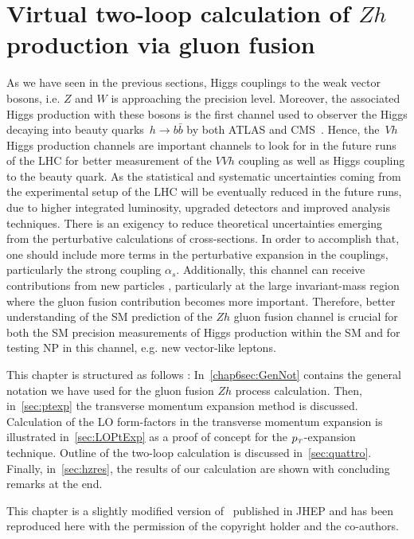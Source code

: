 \chapter{ Virtual two-loop calculation of  $Zh$ production via gluon fusion}\label{chap:hz}
\par As we have seen in the previous sections, Higgs couplings to the weak vector bosons, i.e. $Z$ and $W$ is approaching the precision level. Moreover, the associated Higgs production with these bosons is the first channel used to observer the Higgs decaying into beauty quarks~$h \rightarrow b \bar{b}$ by both ATLAS and CMS~\cite{Aaboud:2018zhk, Sirunyan:2018kst}. Hence, the~$Vh$ Higgs production channels are important channels to look for in the future runs of the LHC for better measurement of the $VVh$ coupling as well as Higgs coupling to the beauty quark. As the statistical and systematic uncertainties coming from the experimental setup of the LHC will be eventually reduced in the future runs, due to higher integrated luminosity,  upgraded detectors and improved analysis techniques. There is an exigency to reduce theoretical uncertainties emerging from the perturbative calculations of  cross-sections. In order to accomplish that, one should include more terms in the perturbative expansion in the couplings, particularly the strong coupling $\alpha_s$. 
Additionally, this channel can receive contributions from new particles \cite{Harlander:2013mla}, particularly at the large invariant-mass region where the gluon fusion contribution becomes more important. Therefore, better understanding of the SM prediction of the $Zh$ gluon fusion channel is crucial for both the SM precision measurements of Higgs production within the SM and for testing NP in this channel, e.g. new vector-like leptons.  
\par This chapter is structured as follows : In~\autoref{chap6sec:GenNot} contains the general notation we have used for the gluon fusion $Zh$ process calculation. Then, in~\autoref{sec:ptexp} the transverse momentum expansion method is discussed.  Calculation of the LO form-factors in the transverse momentum expansion is illustrated in~\autoref{sec:LOPtExp} as a proof of concept for the $p_{\scriptscriptstyle T}$-expansion technique. Outline of the two-loop calculation is discussed in~\autoref{sec:quattro}. Finally, in~\autoref{sec:hzres}, the results of our calculation are shown with concluding remarks at the end. 
\par This chapter is a slightly modified version of~\cite{Alasfar:2021ppe} published in JHEP and has been reproduced here with the permission of the copyright holder and the co-authors.
